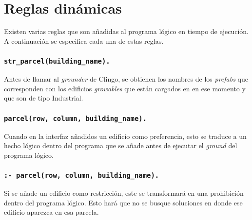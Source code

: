 \section{Reglas dinámicas}

Existen varias reglas que son añadidas al programa lógico en tiempo de ejecución. A continuación se especifica cada una de estas reglas.

\subsubsection{\large\texttt{str\_parcel(building\_name).}}

Antes de llamar al \textit{grounder} de Clingo, se obtienen los nombres de los \textit{prefabs} que corresponden con los edificios \textit{growables} que están cargados en \cities en ese momento y que son de tipo Industrial.

\subsubsection{\large\texttt{parcel(row, column, building\_name).}}

Cuando en la interfaz añadidos un edificio como preferencia, esto se traduce a un hecho lógico dentro del programa que se añade antes de ejecutar el \textit{ground} del programa lógico.

\subsubsection{\large\texttt{:- parcel(row, column, building\_name).}}

Si se añade un edificio como restricción, este se transformará en una prohibición dentro del programa lógico. Esto hará que no se busque soluciones en donde ese edificio aparezca en esa parcela.